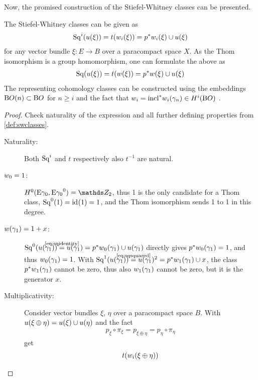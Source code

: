 Now, the promised construction of the Stiefel-Whitney classes can be presented.
\begin{Thm}\label{thm:altdefswclasses}
  The Stiefel-Whitney classes can be given as
  \begin{gather*}
    \mathrm{Sq}^{i}({u}(\xi)) = t({w_{i}}(\xi)) = {p}^* {w_{i}}(\xi) \cup {u}(\xi)
  \end{gather*}
  for any vector bundle $\xi\colon E\to B$ over a paracompact space
  $X$. As the Thom isomorphism is a group homomorphism, one can
  formulate the above as
  \begin{gather*}
    \mathrm{Sq}({u}(\xi)) = t({w}(\xi)) = {p}^* {w}(\xi) \cup {u}(\xi)
  \end{gather*}
  The representing cohomology classes can be constructed using the
  embeddings $\mathrm{B}O(n)\subset\mathrm{B}O$ for $n\geq i$ and the fact that
  $w_{i}={\mathrm{incl}}^*{w_{i}}(\gamma_n)\in H^i(\mathrm{B}O)$
  \cite[see \forexample][Theorem~7.1~ff.]{milnor}.
  \begin{proof}
    Check naturality of the expression and all further
    defining properties from \autoref{def:swclasses}.
    \begin{description}
    \item[Naturality:] Both $\mathrm{Sq}^{i}$ and $t$ respectively also $t^{-1}$
      are natural.
    \item[$w_{0}=1$:]
      $\H^0(\thomspacepair{\E{\gamma_0}}) = \Zmod2$, thus 1 is the only
      candidate for a Thom class, $\mathrm{Sq}^{0}(1) = \mathrm{id}_{}(1) = 1$, and the Thom
      isomorphism sends 1 to 1 in this degree.
    \item[${w}(\gamma_1)=1+x$:]
      $\Sq 0(\u{\gamma_1})\cequalsby{\eqref{eq:sqidentity}}\u{\gamma_1}
      = \pb p\w{0}{\gamma_1}\cup\u{\gamma_1}$
      directly gives
      ${p}^*{w_{0}}(\gamma_1)=1$, and thus ${w_{0}}(\gamma_1)=1$.
      With
      $\Sq 1(\u{\gamma_1})\cequalsby{\eqref{eq:sqsquared}}\u{\gamma_1}^2
      =\pb p\w{1}{\gamma_1}\cup x$,
      the class ${p}^*{w_{1}}(\gamma_1)$ cannot be zero, thus also
      ${w_{1}}(\gamma_1)$ cannot be zero, but it is the generator $x$.
    \item[Multiplicativity:]
      Consider vector bundles $\xi$, $\eta$ over a paracompact space
      $B$. With ${u}(\xi\oplus\eta)={u}(\xi)\cup{u}(\eta)$ and the fact
      \begin{gather}\label{eq:projectionscommute}
        p_\xi\circ\pi_\xi = p_{\xi\oplus\eta} = p_\eta\circ\pi_\eta
      \end{gather}
      get
      \begin{align*}
        \thomiso(\w{i}{\xi\oplus\eta})

\end{align*}
\end{description}
\end{proof}
\end{Thm}
